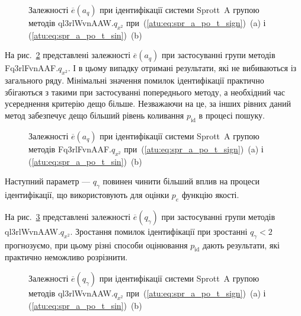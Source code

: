 \begin{figure}[htb!]
  \caption{Залежності $\overline{e}(a_q)$ при ідентифікації системи Sprott~A групою методів ql3rlWvnAAW.$q_{x^2}$ при~(\ref{atu:eq:spr_a_po_t_sign})~(a) і (\ref{atu:eq:spr_a_po_t_sin})~(b)}
  \label{atu:f:spr_a_a_q_ql3rlWvnAAW_q_x2}
\end{figure}


На рис.~\ref{atu:f:spr_a_a_q_Fq3rlFvnAAF_q_x2} представлені залежності
$\overline{e} (a_q)$ при застосуванні групи методів Fq3rlFvnAAF.$q_{x^2}$.
І в цьому випадку отримані результати, які не
вибиваються із загального ряду. Мінімальні значення помилок
ідентифікації практично збігаються з такими при застосуванні
попереднього методу, а необхідний час усереднення критерію
дещо більше. Незважаючи на це, за інших рівних даний метод
забезпечує дещо більший рівень коливання
$p_\mathrm{id}$ в процесі пошуку.


\begin{figure}[htb!]
  \caption{Залежності $\overline{e}(a_q)$ при ідентифікації системи Sprott~A групою методів Fq3rlFvnAAF.$q_{x^2}$ при~(\ref{atu:eq:spr_a_po_t_sign})~(a) і (\ref{atu:eq:spr_a_po_t_sin})~(b)}
  \label{atu:f:spr_a_a_q_Fq3rlFvnAAF_q_x2}
\end{figure}

Наступний параметр ---
$q_\gamma$ повинен чинити більший вплив на процеси ідентифікації,
що використовують для оцінки
$p_e$ функцію якості.

На рис.~\ref{atu:f:spr_a_ql3rlWvnAAW_q_x2} представлені залежності
$\overline{e}(q_\gamma)$ при застосуванні групи методів ql3rlWvnAAW.$q_{x^2}$.
Зростання помилок ідентифікації при зростанні
$q_\gamma <2$ прогнозуємо, при цьому різні способи оцінювання
$p_\mathrm{id}$ дають результати, які практично неможливо розрізнити.

\begin{figure}[htb!]
  \caption{Залежності $\overline{e} (q_\gamma)$ при ідентифікації системи Sprott~A групою методів ql3rlWvnAAW.$q_{x^2}$ при~(\ref{atu:eq:spr_a_po_t_sign})~(a) і (\ref{atu:eq:spr_a_po_t_sin})~(b)}
  \label{atu:f:spr_a_ql3rlWvnAAW_q_x2}
\end{figure}


